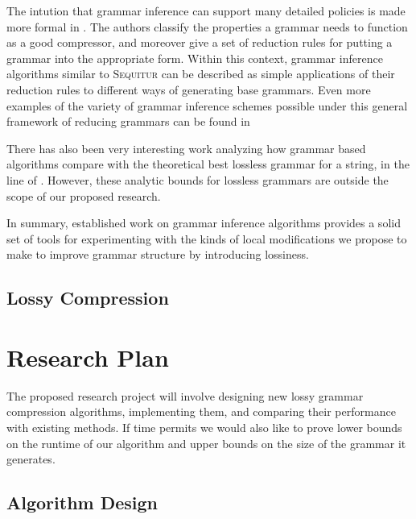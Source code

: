 \documentclass[11pt]{article}
\newcommand{\Sequitur}{\textsc{Sequitur}\xspace}
\begin{document}
The intution that grammar inference can support many detailed policies is made
more formal in \cite{grammarcodes}.  The authors classify the properties a
grammar needs to function as a good compressor, and moreover give a set of
reduction rules for putting a grammar into the appropriate form.  Within this
context, grammar inference algorithms similar to \Sequitur can be described as
simple applications of their reduction rules to different ways of generating
base grammars.  Even more examples of the variety of grammar inference schemes
possible under this general framework of reducing grammars can be found in
\cite{efficientgreedy}

There has also been very interesting work analyzing how grammar based
algorithms compare with the theoretical best lossless grammar for a string, in
the line of \cite{approximation}.  However, these analytic bounds for lossless
grammars are outside the scope of our proposed research.

In summary, established work on grammar inference algorithms provides a solid
set of tools for experimenting with the kinds of local modifications we propose
to make to improve grammar structure by introducing lossiness.

\subsection{Lossy Compression}

\section{Research Plan}

The proposed research project will involve designing new lossy grammar
compression algorithms, implementing them, and comparing their performance with
existing methods.  If time permits we would also like to prove lower bounds on
the runtime of our algorithm and upper bounds on the size of the grammar it
generates.

\subsection{Algorithm Design}
\end{document}
